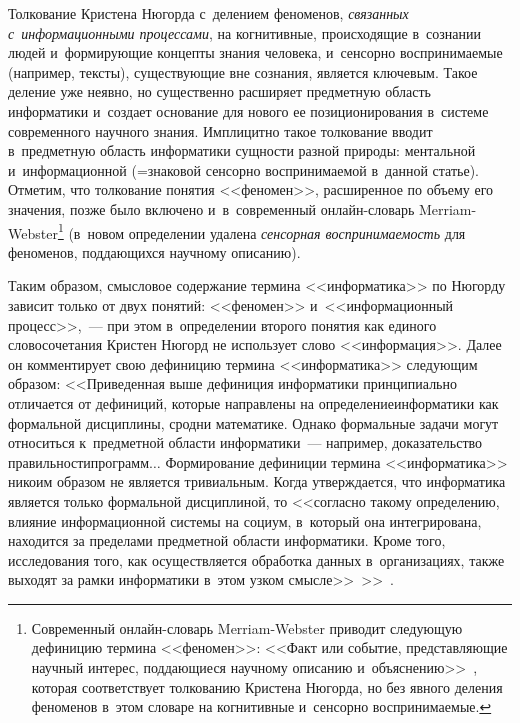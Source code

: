 \begin{multicols}{2}
  Толкование Кристена Нюгорда с~делением феноменов, \textit{связанных 
с~информационными процессами}, на когнитивные, происходящие 
в~сознании людей и~формирующие концепты знания человека, и~сенсорно 
воспринимаемые (например, тексты), существующие вне сознания, является 
ключевым. Такое деление уже неявно, но существенно расширяет 
предметную область информатики и~создает основание для нового ее 
позиционирования в~сис\-те\-ме современного научного знания. Имплицитно 
такое толкование вводит в~пред\-мет\-ную об\-ласть информатики сущ\-ности 
разной природы: ментальной и~информационной (=\;зна\-ко\-вой сенсорно 
воспринимаемой в~данной \mbox{статье}). Отметим, что толкование понятия 
<<феномен>>, расширенное по объему его значения, позже было включено 
и~в~современный он\-лайн-сло\-варь Merriam-Webster\footnote{Современный  
он\-лайн-сло\-варь Merriam-Webster приводит следующую дефиницию термина <<феномен>>: 
<<Факт или событие, представляющие научный интерес, поддающиеся научному описанию 
и~объяснению>>~\cite{12-zac}, которая соответствует толкованию Кристена Нюгорда, но без явного 
деления феноменов в~этом словаре на когнитивные и~сенсорно воспринимаемые.} (в~новом 
определении удалена \textit{сенсорная воспринимаемость} для феноменов, 
поддающихся научному опи\-санию).
{

}
  
  Таким образом, смысловое содержание термина <<информатика>> по 
Нюгорду зависит только от двух понятий: <<феномен>> 
и~<<информационный процесс>>,~--- при этом в~определении второго понятия 
как единого словосочетания Кристен Нюгорд не использует слово 
<<информация>>. Далее он комментирует свою дефиницию термина 
<<информатика>> следующим образом:
  <<Приведенная выше дефиниция информатики принципиально 
отличается от дефиниций, которые на\-прав\-ле\-ны на определение\linebreak информатики 
как формальной дис\-ципли\-ны, сродни математике. Однако формальные 
задачи могут относиться к~пред\-мет\-ной об\-ласти информатики~--- например, 
доказательство пра\-виль\-ности\linebreak про\-грамм$\ldots$ Формирование дефиниции 
термина <<информатика>> никоим образом не является тривиальным. Когда 
утверждается, что информатика является только формальной дис\-циплиной, 
то <<согласно такому определению, вли\-яние информационной сис\-те\-мы на 
социум, в~который она интегрирована, находится за пределами пред\-мет\-ной 
об\-ласти информатики. Кроме того, исследования того, как осуществляется 
обработка данных в~организациях, так\-же выходят за рамки информатики в~этом уз\-ком смыс\-ле>>~\cite{13-zac}>>~\cite{8-zac}.
  

\end{multicols}

